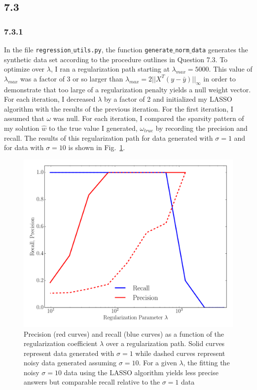 \documentclass[12pt]{amsart}
\begin{document}
\subsection*{7.3}

\subsubsection*{7.3.1}

In the file {\tt regression$\_$utils.py}, the function {\tt generate$\_$norm$\_$data} generates the synthetic data set according to the procedure outlines in Question 7.3.  To optimize over $\lambda$, I ran a regularization path starting at $\lambda_{max} = 5000$.  This value of  $\lambda_{max}$ was a factor of 3 or so larger than $\lambda_{max} = 2 ||X^{T}(y - \bar{y}) ||_{\infty}$ in order to demonstrate that too large of a regularization penalty yields a null weight vector.  For each iteration, I decreased $\lambda$ by a factor of 2 and initialized my LASSO algorithm with the results of the previous iteration.  For the first iteration, I assumed that $\omega$ was null.  For each iteration, I compared the sparsity pattern of my solution $\hat{w}$ to the true value I generated, $\omega_{true}$ by recording the precision and recall. The results of this regularization path for data generated with $\sigma = 1$ and for data with $\sigma = 10$ is shown in Fig.~\ref{fig:synth_reg}.

\begin{figure}
	\includegraphics[width=\columnwidth]{synthetic_prec_rec.pdf}
    \caption{Precision (red curves) and recall (blue curves) as a function of the regularization coefficient $\lambda$ over a regularization path.  Solid curves represent data generated with $\sigma = 1$ while dashed curves represent noisy data generated assuming $\sigma = 10$.  For a given $\lambda$, the fitting the noisy $\sigma = 10$ data using the LASSO algorithm yields less precise answers but comparable recall relative to the $\sigma = 1$ data}
    \label{fig:synth_reg}
\end{figure}
\end{document}
